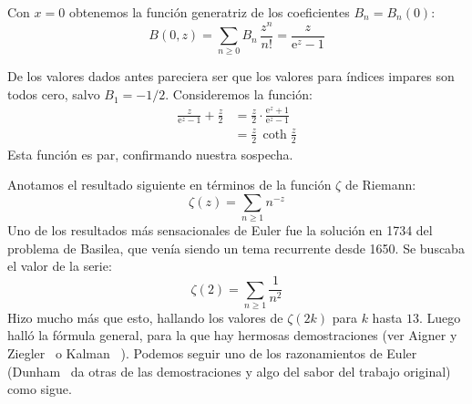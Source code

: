   Con \(x = 0\) obtenemos la función generatriz
  de los coeficientes \(B_n = B_n(0)\):%
  \begin{equation}
    \label{eq:B(0,z)}
    B(0, z)
      = \sum_{n \ge 0} B_n \, \frac{z^n}{n!}
      = \frac{z}{\mathrm{e}^z - 1}
  \end{equation}

  De los valores dados antes
  pareciera ser que los valores para índices impares son todos cero,
  salvo \mbox{\(B_1 = - 1 / 2\)}.
  Consideremos la función:
  \begin{align*}
    \frac{z}{\mathrm{e}^z - 1} + \frac{z}{2}
      &= \frac{z}{2}
	   \cdot \frac{\mathrm{e}^z + 1}{\mathrm{e}^z - 1} \\
      &= \frac{z}{2} \, \coth \frac{z}{2}
  \end{align*}
  Esta función es par,
  confirmando nuestra sospecha.

  Anotamos el resultado siguiente
  en términos de la función \(\zeta\) de Riemann:%
  \begin{equation}
    \label{eq:zeta}
    \zeta(z)
      = \sum_{n \ge 1} n^{-z}
  \end{equation}
  Uno de los resultados más sensacionales de Euler
  fue la solución en 1734 del problema de Basilea,%
  que venía siendo un tema recurrente desde 1650.
  Se buscaba el valor de la serie:
  \begin{equation}
    \label{eq:zeta(z)}
    \zeta(2)
      = \sum_{n \ge 1} \frac{1}{n^2}
  \end{equation}
  Hizo mucho más que esto,
  hallando los valores de \(\zeta(2 k)\) para \(k\) hasta \(13\).
  Luego halló la fórmula general,
  para la que hay hermosas demostraciones
  (ver Aigner y Ziegler~%
    \cite{aigner14:_proof_the_book}
   o Kalman~%
    \cite{kalman93:_six_ways_sum_series}).
  Podemos seguir uno de los razonamientos de Euler
  (Dunham~\cite{dunham09:_when_euler_met_lhopital}
   da otras de las demostraciones
   y algo del sabor del trabajo original)
  como sigue.

